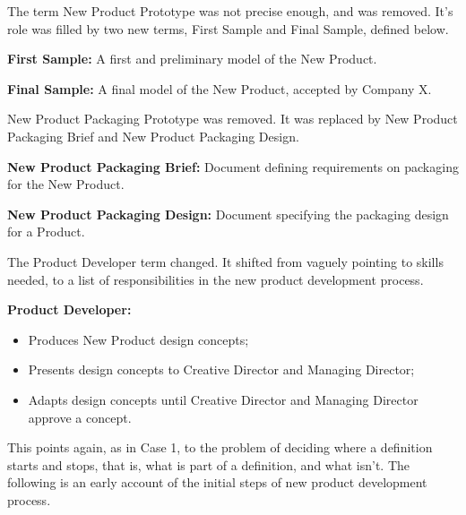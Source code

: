 \documentclass[graybox,envcountchap,sectrefs]{svmono}
\begin{document}
The term New Product Prototype was not precise enough, and was removed. It's role was filled by two new terms, First Sample and Final Sample, defined below.

\begin{svgraybox}
\noindent\textbf{First Sample:} A first and preliminary model of the New Product.

\noindent\textbf{Final Sample:} A final model of the New Product, accepted by Company X.
\end{svgraybox}

New Product Packaging Prototype was removed. It was replaced by New Product Packaging Brief and New Product Packaging Design.

\begin{svgraybox}
\noindent\textbf{New Product Packaging Brief:} Document defining requirements on packaging for the New Product.

\noindent\textbf{New Product Packaging Design:} Document specifying the packaging design for a Product.
\end{svgraybox}

The Product Developer term changed. It shifted from vaguely pointing to skills needed, to a list of responsibilities in the new product development process.

\begin{svgraybox}
\textbf{Product Developer:}
\begin{itemize}
	\item Produces New Product design concepts;
	\item Presents design concepts to Creative Director and Managing Director;
	\item Adapts design concepts until Creative Director and Managing Director approve a concept.
\end{itemize}
\end{svgraybox}

This points again, as in Case 1, to the problem of deciding where a definition starts and stops, that is, what is part of a definition, and what isn't. The following is an early account of the initial steps of new product development process.
\end{document}
